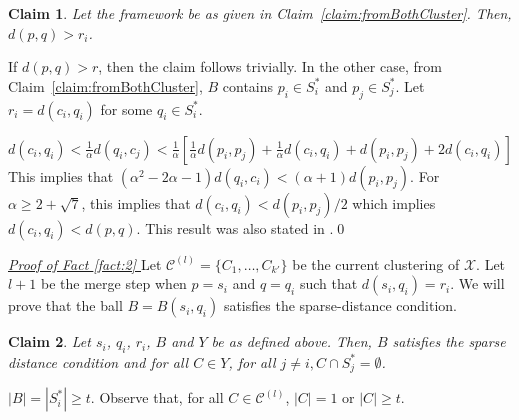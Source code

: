 \documentclass[letterpaper,12pt,titlepage,oneside,final]{book}
\newtheorem{smallLemma}{Claim}
\newcommand{\mc}{\mathcal}
\begin{document}
\begin{smallLemma}
\label{claim:maxrirj}
Let the framework be as given in Claim~\ref{claim:fromBothCluster}. Then, $d(p, q) > r_i$.
\end{smallLemma}

\vspace{-0.1in} \noindent If $d(p, q) > r$, then the claim follows trivially. In the other case, from Claim~\ref{claim:fromBothCluster}, $B$ contains $p_i \in S_i^*$ and $p_j \in S_j^*$. Let $r_i = d(c_i, q_i)$ for some $q_i \in S_i^*$.

$d(c_i, q_i) < \frac{1}{\alpha} d(q_i, c_j) < \frac{1}{\alpha} [ \frac{1}{\alpha}d(p_i, p_j) + \frac{1}{\alpha}d(c_i, q_i) + d(p_i, p_j) + 2d(c_i, q_i)]$
This implies that $(\alpha^2 - 2\alpha - 1)d(q_i, c_i) < (\alpha + 1) d(p_i, p_j)$. For $\alpha \ge 2 + \sqrt 7$, this implies that $d(c_i, q_i) < d(p_i, p_j)/2$ which implies $d(c_i, q_i) < d(p, q)$. This result was also stated in \cite{balcan2012clustering}.\qed

\noindent\textit{\underline{Proof of Fact \ref{fact:2}
}}
Let $\mc C^{(l)} = \{C_1, \ldots, C_{k'}\}$ be the current clustering of $\mc X$. Let $l+1$ be the merge step when $p = s_i$ and $q = q_i$ such that $d(s_i, q_i) = r_i$. We will prove that the ball $B = B(s_i, q_i)$ satisfies the sparse-distance condition.

\begin{smallLemma}
\label{claim:dciqi}
Let $s_i$, $q_i$, $r_i$, $B$ and $Y$ be as defined above. Then, $B$ satisfies the sparse distance condition and for all $C \in Y$, for all $j \neq i, C \cap S_j^* = \emptyset$.
\end{smallLemma}
\vspace{-0.1in} $|B| = |S_i^*| \ge t$. Observe that, for all $C \in \mc C^{(l)}$, $|C| = 1$ or $|C| \ge t$. 
\end{document}
